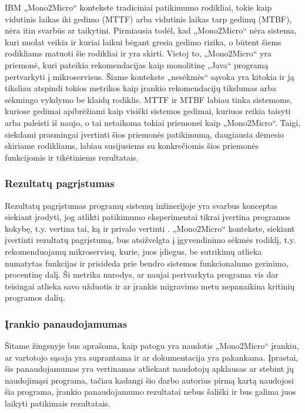 \documentclass{VUMIFPSbakalaurinis}
\begin{document}
IBM „Mono2Micro“ kontekste tradiciniai patikimumo rodikliai, tokie kaip vidutinis laikas iki gedimo (MTTF) arba vidutinis laikas tarp gedimų (MTBF), nėra itin svarbūs ar taikytini. Pirmiausia todėl, kad „Mono2Micro“ nėra sistema, kuri nuolat veikia ir kuriai laikui bėgant gresia gedimo rizika, o būtent šiems rodikliams matuoti šie rodikliai ir yra skirti. Vietoj to, „Mono2Micro“ yra priemonė, kuri pateikia rekomendacijas kaip monolitinę „Java“ programą pertvarkyti į mikroservisus. Šiame kontekste „nesėkmės“ sąvoka yra kitokia ir ją tiksliau atspindi tokios metrikos kaip įrankio rekomendacijų tikslumas arba sėkmingo vykdymo be klaidų rodiklis. MTTF ir MTBF labiau tinka sistemoms, kuriose gedimai apibrėžiami kaip visiški sistemos gedimai, kuriuos reikia taisyti arba paleisti iš naujo, o tai netaikoma tokiai priemonei kaip „Mono2Micro“. Taigi, siekdami prasmingai įvertinti šios priemonės patikimumą, daugiausia dėmesio skiriame rodikliams, labiau susijusiems su konkrečiomis šios priemonės funkcijomis ir tikėtiniems rezultatais.
\subsubsection{Rezultatų pagrįstumas}
Rezultatų pagrįstumas programų sistemų inžinerijoje yra svarbus konceptas siekiant įrodyti, jog atlikti patikimumo eksperimentai tikrai įvertina programos kokybę, t.y. vertina tai, ką ir privalo vertinti \cite{LMPV}. „Mono2Micro“ kontekste, siekiant įvertinti rezultatų pagrįstumą, bus atsižvelgta į įgyvendinimo sėkmės rodiklį, t.y. rekomenduojamų mikroservisų, kurie, juos įdiegus, be sutrikimų atlieka numatytas funkcijas ir prisideda prie bendro sistemos funkcionalumo gerinimo, procentinę dalį. Ši metrika nurodys, ar naujai pertvarkyta programa vis dar teisingai atlieka savo užduotis ir ar įrankis migravimo metu nepanaikina kritinių programos dalių.

\subsubsection{Įrankio panaudojamumas}
Šitame žingsnyje bus aprašoma, kaip patogu yra naudotis „Mono2Micro“ įrankiu, ar vartotojo sąsaja yra suprantama ir ar dokumentacija yra pakankama. Įprastai, šis panaudojamumas yra vertinamas atliekant naudotojų apklausas ar stebint jų naudojimąsi programa, tačiau kadangi šio darbo autorius pirmą kartą naudojosi šia programa, įrankio panaudojamumo rezultatai nebus šališki ir bus galima juos laikyti patikimais rezultatais.
\end{document}
